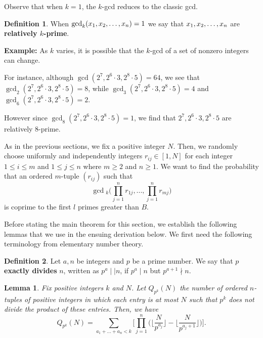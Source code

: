 \documentclass[10pt,a4paper]{article}
\newtheorem{lemma}[theorem]{Lemma}
\theoremstyle{definition}
\newtheorem{definition}{Definition}[section]
\theoremstyle{remark}
\begin{document}
\noindent Observe that when $k=1$, the $k$-gcd reduces to the classic gcd.

\begin{definition} When $\gcd_k(x_1,x_2,\mathellipsis,x_n)=1$ we say that  $x_1,x_2,\mathellipsis,x_n$ are \textbf{relatively $k$-prime}.
\end{definition}

\noindent \textbf{Example:}
As $k$ varies, it is possible that the $k$-gcd of a set of nonzero integers can change. 

\noindent For instance, although $\gcd(2^7, 2^6 \cdot 3, 2^8 \cdot 5) = 64$, we see that $\gcd_2(2^7, 2^6 \cdot 3, 2^8 \cdot 5)=8$, while $\gcd_3(2^7, 2^6 \cdot 3, 2^8 \cdot 5)=4$ and $\gcd_6(2^7, 2^6 \cdot 3, 2^8 \cdot 5) = 2$. 

\noindent However since $\gcd_8(2^7, 2^6 \cdot 3, 2^8 \cdot 5) = 1$, we find that $2^7, 2^6 \cdot 3, 2^8 \cdot 5$ are relatively $8$-prime.

As in the previous sections, we fix a positive integer $N$. Then, we randomly choose uniformly and independently integers $r_{ij} \in [1, N]$ for each integer $1 \leq i \leq m$ and $1 \leq j \leq n$ where $m \geq 2$ and $n \geq 1$. We want to find the probability that an ordered $m$-tuple $(r_{ij})$ such that 
$$\gcd{}_k\Big(\prod_{j=1}^nr_{1j}, ..., \prod_{j=1}^n r_{mj}\Big)$$
is coprime to the first $l$ primes greater than $B$. 

Before stating the main theorem for this section, we establish the following lemmas that we use in the ensuing derivation below. We first need the following terminology from elementary number theory.

\begin{definition}
Let $a, n$ be integers and $p$ be a prime number. We say that $p$ \textbf{exactly divides} $n$, written as $p^a \mid \mid n$, if $p^a \mid n$ but $p^{a+1} \nmid n$. 
\end{definition}

\begin{lemma}
Fix positive integers $k$ and $N$. Let $Q_{p^k}(N)$ the number of ordered $n$-tuples of positive integers in which each entry is at most $N$ such that $p^k$ does not divide the product of these entries. Then, we have
$$Q_{p^k}(N) = \sum_{a_1+...+a_n < k} \Big[\prod_{j=1}^n \Big(\Big\lfloor \frac{N}{p^{a_j}}\Big\rfloor - \Big\lfloor \frac{N}{p^{a_j + 1}}\Big\rfloor\Big)\Big].$$
\end{lemma}
\end{document}
